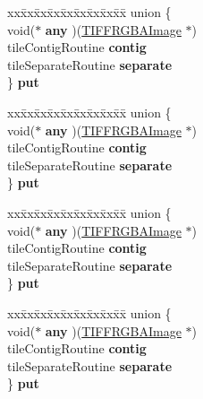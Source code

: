 \begin{DoxyCompactItemize}
\begin{tabbing}
\end{tabbing}\item 
\mbox{\label{struct__TIFFRGBAImage_a5d1c875989418e9b4103afff5a6e8f6b}} 
\begin{tabbing}
xx\=xx\=xx\=xx\=xx\=xx\=xx\=xx\=xx\=\kill
union \{\\
\>void($\ast$ {\bfseries any} )(\hyperlink{struct__TIFFRGBAImage}{TIFFRGBAImage} $\ast$)\\
\>tileContigRoutine {\bfseries contig}\\
\>tileSeparateRoutine {\bfseries separate}\\
\} {\bfseries put}\\

\end{tabbing}\item 
\mbox{\label{struct__TIFFRGBAImage_a39c5a43c3b7dfd96292557b1b03c32ab}} 
\begin{tabbing}
xx\=xx\=xx\=xx\=xx\=xx\=xx\=xx\=xx\=\kill
union \{\\
\>void($\ast$ {\bfseries any} )(\hyperlink{struct__TIFFRGBAImage}{TIFFRGBAImage} $\ast$)\\
\>tileContigRoutine {\bfseries contig}\\
\>tileSeparateRoutine {\bfseries separate}\\
\} {\bfseries put}\\

\end{tabbing}\item 
\mbox{\label{struct__TIFFRGBAImage_acfdc58067cd6ea40959c5435645f4da9}} 
\begin{tabbing}
xx\=xx\=xx\=xx\=xx\=xx\=xx\=xx\=xx\=\kill
union \{\\
\>void($\ast$ {\bfseries any} )(\hyperlink{struct__TIFFRGBAImage}{TIFFRGBAImage} $\ast$)\\
\>tileContigRoutine {\bfseries contig}\\
\>tileSeparateRoutine {\bfseries separate}\\
\} {\bfseries put}\\

\end{tabbing}\item 
\mbox{\label{struct__TIFFRGBAImage_a8b9d57dfada341ff843987c16e1c429e}} 
\begin{tabbing}
xx\=xx\=xx\=xx\=xx\=xx\=xx\=xx\=xx\=\kill
union \{\\
\>void($\ast$ {\bfseries any} )(\hyperlink{struct__TIFFRGBAImage}{TIFFRGBAImage} $\ast$)\\
\>tileContigRoutine {\bfseries contig}\\
\>tileSeparateRoutine {\bfseries separate}\\
\} {\bfseries put}\\


\end{tabbing}
\end{DoxyCompactItemize}
